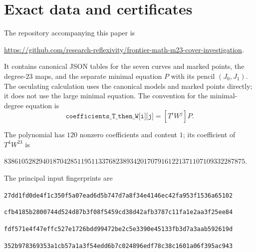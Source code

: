 \documentclass[11pt]{amsart}
\theoremstyle{definition}
\theoremstyle{remark}
\begin{document}
\section{Exact data and certificates}
\label{sec:certificates}

The repository accompanying this paper is
\begin{center}
\url{https://github.com/research-reflexivity/frontier-math-m23-cover-investigation}.
\end{center}
It contains canonical JSON tables for the seven curves and marked
points, the degree-$23$ maps, and the separate minimal equation
$P$ with its pencil $(J_0,J_1)$.
The osculating calculation uses the canonical models and marked
points directly; it does not use the large minimal equation.
The convention for the minimal-degree equation is
\[
 \texttt{coefficients\_T\_then\_W[i][j]}=[T^iW^j]P.
\]
\par\noindent
\begin{minipage}{\textwidth}
The polynomial has $120$ nonzero coefficients and content $1$; its
coefficient of $T^4W^{23}$ is
\par\vspace{4pt}
\centering
$838610528294018704285119511337682389342017079161221371107109332287875$.
\end{minipage}
\par\vspace{4pt}
The principal input fingerprints are
\par\vspace{4pt}
\begingroup
\centering\small
{}\par
\texttt{27dd1fd0de4f1c350f5a07ead6d5b747d7a8f34e4146ec42fa953f1536a65102}\par\vspace{3pt}
\par
\texttt{cfb4185b2800744d524d87b3f08f5459cd38d42afb3787c11fa1e2aa3f25ee84}\par\vspace{3pt}
\par
\texttt{fdf571e4f47effc527e1726bdd99472be2c5e3390e45133fb3d7a3aab592619d}\par\vspace{3pt}
\par
\texttt{352b978369353a1cb57a1a3f54edd6b7c024896edf78c38c1601a06f395ac943}\par\vspace{3pt}
\end{document}
